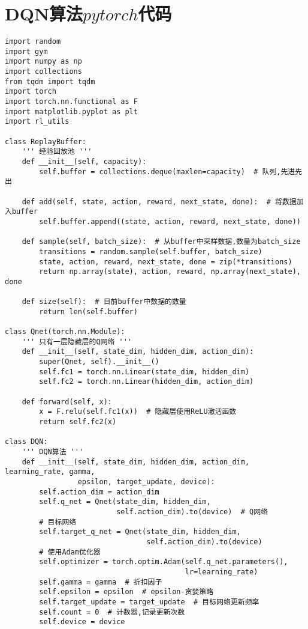 \section{DQN算法$pytorch$代码}
\begin{lstlisting}
import random
import gym
import numpy as np
import collections
from tqdm import tqdm
import torch
import torch.nn.functional as F
import matplotlib.pyplot as plt
import rl_utils

class ReplayBuffer:
    ''' 经验回放池 '''
    def __init__(self, capacity):
        self.buffer = collections.deque(maxlen=capacity)  # 队列,先进先出

    def add(self, state, action, reward, next_state, done):  # 将数据加入buffer
        self.buffer.append((state, action, reward, next_state, done))

    def sample(self, batch_size):  # 从buffer中采样数据,数量为batch_size
        transitions = random.sample(self.buffer, batch_size)
        state, action, reward, next_state, done = zip(*transitions)
        return np.array(state), action, reward, np.array(next_state), done

    def size(self):  # 目前buffer中数据的数量
        return len(self.buffer)

class Qnet(torch.nn.Module):
    ''' 只有一层隐藏层的Q网络 '''
    def __init__(self, state_dim, hidden_dim, action_dim):
        super(Qnet, self).__init__()
        self.fc1 = torch.nn.Linear(state_dim, hidden_dim)
        self.fc2 = torch.nn.Linear(hidden_dim, action_dim)

    def forward(self, x):
        x = F.relu(self.fc1(x))  # 隐藏层使用ReLU激活函数
        return self.fc2(x)

class DQN:
    ''' DQN算法 '''
    def __init__(self, state_dim, hidden_dim, action_dim, learning_rate, gamma,
                 epsilon, target_update, device):
        self.action_dim = action_dim
        self.q_net = Qnet(state_dim, hidden_dim,
                          self.action_dim).to(device)  # Q网络
        # 目标网络
        self.target_q_net = Qnet(state_dim, hidden_dim,
                                 self.action_dim).to(device)
        # 使用Adam优化器
        self.optimizer = torch.optim.Adam(self.q_net.parameters(),
                                          lr=learning_rate)
        self.gamma = gamma  # 折扣因子
        self.epsilon = epsilon  # epsilon-贪婪策略
        self.target_update = target_update  # 目标网络更新频率
        self.count = 0  # 计数器,记录更新次数
        self.device = device


\end{lstlisting}
